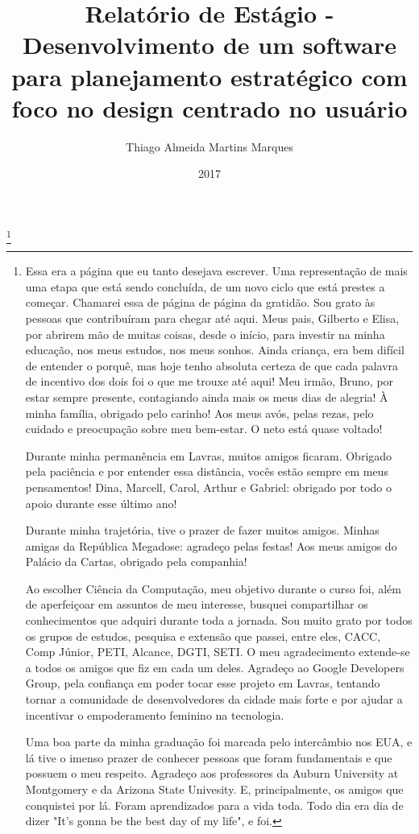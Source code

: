 \documentclass{uflamon}          %
\author{Thiago Almeida Martins Marques}
\title{Relatório de Estágio - Desenvolvimento de um software para planejamento estratégico com foco no design centrado no usuário}
\date{2017}
\begin{document}
\maketitle
{}     



\thanks{
Essa era a página que eu tanto desejava escrever. Uma  representação de mais uma etapa que está sendo concluída, de um novo ciclo que está prestes a começar. Chamarei essa de página de página da gratidão. Sou grato às pessoas que contribuíram para chegar até aqui. Meus pais, Gilberto e Elisa, por abrirem mão de muitas coisas, desde o início, para investir na minha educação, nos meus estudos, nos meus sonhos. Ainda criança, era bem difícil de entender o porquê, mas hoje tenho absoluta certeza de que cada palavra de incentivo dos dois foi o que me trouxe até aqui! Meu irmão, Bruno, por estar sempre presente, contagiando ainda mais os meus dias de alegria!
À minha família, obrigado pelo carinho! Aos meus avós, pelas rezas, pelo cuidado e preocupação sobre meu bem-estar. O neto está quase voltado!

Durante minha permanência em Lavras, muitos amigos ficaram. Obrigado pela paciência e por entender essa distância, vocês estão sempre em meus pensamentos! Dina, Marcell, Carol, Arthur e Gabriel: obrigado por todo o apoio durante esse último ano!

Durante minha trajetória, tive o prazer de fazer muitos amigos. Minhas amigas da República Megadose: agradeço pelas festas! Aos meus amigos do Palácio da Cartas, obrigado pela companhia!

Ao escolher Ciência da Computação, meu objetivo durante o curso foi, além de aperfeiçoar em assuntos de meu interesse, busquei compartilhar os conhecimentos que adquiri durante toda a jornada. Sou muito grato por todos os grupos de estudos, pesquisa e extensão que passei, entre eles, CACC, Comp Júnior, PETI, Alcance, DGTI, SETI. O meu agradecimento extende-se a todos os amigos que fiz em cada um deles. Agradeço ao Google Developers Group, pela confiança em poder tocar esse projeto em Lavras, tentando tornar a comunidade de desenvolvedores da cidade mais forte e por ajudar a incentivar o empoderamento feminino na tecnologia.
 
Uma boa parte da minha graduação foi marcada pelo intercâmbio nos EUA, e lá tive o imenso prazer de conhecer pessoas que foram fundamentais e que possuem o meu respeito. Agradeço aos professores da Auburn University at Montgomery e da Arizona State Univesity. E, principalmente, os amigos que conquistei por lá. Foram aprendizados para a vida toda. Todo dia era dia de dizer "It's gonna be the best day of my life", e foi.

}        
\end{document}
